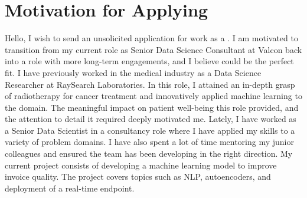 \section{Motivation for Applying}
Hello, I wish to send an unsolicited application for work as a \role{}. I am motivated to transition from my current role as Senior Data Science Consultant at Valcon back into a role with more long-term engagements, and I believe \company{} could be the perfect fit. I have previously worked in the medical industry as a Data Science Researcher at RaySearch Laboratories. In this role, I attained an in-depth grasp of radiotherapy for cancer treatment and innovatively applied machine learning to the domain. The meaningful impact on patient well-being this role provided, and the attention to detail it required deeply motivated me. \newpar Lately, I have worked as a Senior Data Scientist in a consultancy role where I have applied my skills to a variety of problem domains. I have also spent a lot of time mentoring my junior colleagues and ensured the team has been developing in the right direction. My current project consists of developing a machine learning model to improve invoice quality. The project covers topics such as NLP, autoencoders, and deployment of a real-time endpoint.